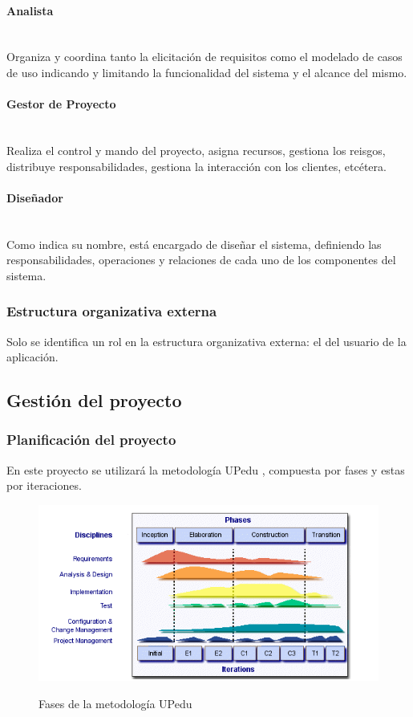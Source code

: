 \documentclass[twoside]{report}
\begin{document}
\paragraph{Analista}\mbox{}\\

Organiza y coordina tanto la elicitación de requisitos como el modelado de casos de uso indicando y limitando la funcionalidad del sistema y el alcance del mismo.

\paragraph{Gestor de Proyecto}\mbox{}\\

Realiza el control y mando del proyecto, asigna recursos, gestiona los reisgos, distribuye responsabilidades, gestiona la interacción con los clientes, etcétera.

\paragraph{Diseñador}\mbox{}\\

Como indica su nombre, está encargado de diseñar el sistema, definiendo las responsabilidades, operaciones y relaciones de cada uno de los componentes del sistema.

\subsubsection{Estructura organizativa externa}
Solo se identifica un rol en la estructura organizativa externa: el del usuario de la aplicación. 

\subsection{Gestión del proyecto}
\subsubsection{Planificación del proyecto}
En este proyecto se utilizará la metodología UPedu \cite{upedu}, compuesta por fases y estas por iteraciones.

\begin{figure}[h]
\begin{center}
\includegraphics[scale=0.75]{images/upeduFases}
\caption{Fases de la metodología UPedu} \cite{upedu}
\end{center}
\end{figure}
\end{document}
